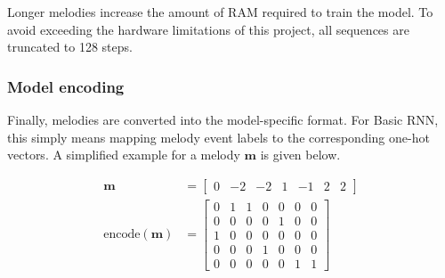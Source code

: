 \documentclass[../../report.tex]{subfiles}
\begin{document}
Longer melodies increase the amount of RAM required to train the model. To avoid
exceeding the hardware limitations of this project, all sequences are truncated
to 128 steps.

\subsubsection{Model encoding}

Finally, melodies are converted into the model-specific format. For Basic RNN,
this simply means mapping melody event labels to the corresponding one-hot
vectors. A simplified example for a melody \(\bm{m}\) is given below.

\begin{align}
  \bm{m} &=
  \begin{bmatrix}
    0 & -2 & -2 & 1 & -1 & 2 & 2
  \end{bmatrix}
  \\
  \mathrm{encode}(\bm{m}) &=
  \begin{bmatrix}
    0 & 1 & 1 & 0 & 0 & 0 & 0 \\
    0 & 0 & 0 & 0 & 1 & 0 & 0 \\
    1 & 0 & 0 & 0 & 0 & 0 & 0 \\
    0 & 0 & 0 & 1 & 0 & 0 & 0 \\
    0 & 0 & 0 & 0 & 0 & 1 & 1
  \end{bmatrix}
\end{align}

\end{document}
